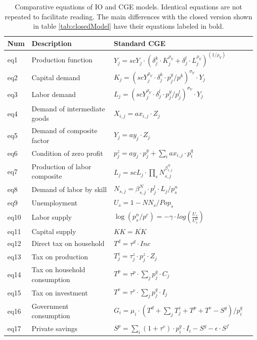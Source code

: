 


\begin{table}[!h]
	\centering
	\caption{Comparative equations of IO and CGE models. Identical equations are not repeated to facilitate reading. The main differences with the closed version shown in table \ref{tab:closedModel} have their equations labeled in bold.}
	\label{tab:fullModel}
	\begin{tabular}{llll}
		\toprule
		Num & Description & Standard CGE  \\
		\midrule
		eq1 & Production function & $Y_j    = scY_j \cdot  ( \delta^k_j \cdot K_j^{\rho_Y} + \delta^l_j \cdot L_j^{\rho_Y} )^(1/\rho_Y)$ \\
		eq2 & Capital demand & $ K_j = (scY_j^{\rho_Y} \cdot  \delta^k_j \cdot  p^y_j / p^k )^{\sigma_Y} \cdot  Y_j $ \\
		eq3 & Labor demand  & $L_j = (scY_j^{\rho_Y} \cdot \delta^l_j \cdot  p^y_j / p^l_j )^{\sigma_Y} \cdot Y_j $ \\	
		eq4 & Demand of intermediate goods & $X_{i,j}  = ax_{i,j} \cdot Z_j$ \\
		eq5 & Demand of composite factor & $Y_j    = ay_j \cdot Z_j$ \\
		eq6 & Condition of zero profit & $p^z_j   = ay_j \cdot p^y_j + \sum_i ax_{i,j} \cdot p^q_i$ \\
		eq7 & Production of labor composite & $L_j    = scL_j \cdot  \prod_s N_{s,j}^{\beta^N_{s,j}}$  \\
		eq8 & Demand of labor by skill & $N_{s,j}  = \beta^N_{s,j} \cdot p^l_j \cdot  L_j / p^n_s$ \\
		eq9 & Unemployment & $ U_s =  1 - NN_s/Pop_s $\\
		eq10 & Labor supply & $\log( p^n_s / p^c ) = - \gamma \cdot  log(\frac{U_s}{U^0_s}) $  \\
		eq11 & Capital supply & $KK = \overline{KK} $  \\
		\midrule
		eq12 & Direct tax on household & $T^d = \tau^d \cdot Inc $\\
		eq13 & Tax on production & $T^z_j = \tau^z_j \cdot p^z_j \cdot Z_j$ \\
		eq14 & Tax on household consumption & $T^p = \tau^p \cdot \sum_j  p^q_j \cdot C_j $ \\
		eq15 & Tax on investment & $T^v = \tau^v \cdot \sum_j p^q_j\cdot I_j $ \\
		eq16 & Government consumption & $G_i = \mu_i \cdot ( T^d + \sum_j T^z_j + T^p + T^v - S^g ) / p^q_i$ \\
		\midrule
		eq17 & Private savings & $S^p = \sum_i (1+\tau^v) \cdot p^q_i \cdot I_i - S^g - \epsilon \cdot S^f$ \\

\end{tabular}
\end{table}
